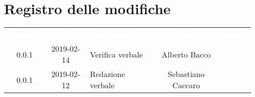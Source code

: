 \section*{Registro delle modifiche}
{
	\renewcommand{\arraystretch}{1.5}
	\centering
	\begin{longtable}{ c c  C{4cm}  c  c }
		
		\textcolor{white}{\textbf{Versione}} & \textcolor{white}{\textbf{Data}} & \textcolor{white}{\textbf{Descrizione}} & \textcolor{white}{\textbf{Autore}} & \textcolor{white}{\textbf{Ruolo}}\\
		
		0.0.1 & 2019-02-14 & Verifica verbale & Alberto Bacco & \ver{}\\
		0.0.1 & 2019-02-12 & Redazione verbale & Sebastiano Caccaro & \reda{}\\
		
		
	\end{longtable}
	
}